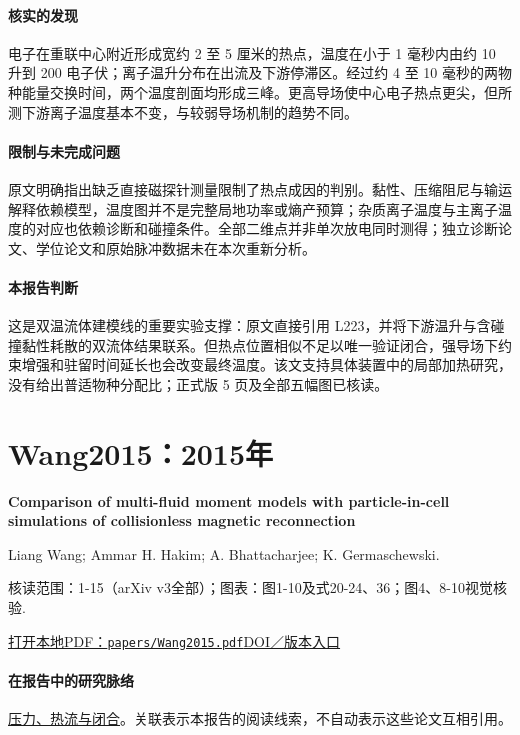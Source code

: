 \paragraph{核实的发现}电子在重联中心附近形成宽约 2 至 5 厘米的热点，温度在小于 1 毫秒内由约 10 升到 200 电子伏；离子温升分布在出流及下游停滞区。经过约 4 至 10 毫秒的两物种能量交换时间，两个温度剖面均形成三峰。更高导场使中心电子热点更尖，但所测下游离子温度基本不变，与较弱导场机制的趋势不同。

\paragraph{限制与未完成问题}原文明确指出缺乏直接磁探针测量限制了热点成因的判别。黏性、压缩阻尼与输运解释依赖模型，温度图并不是完整局地功率或熵产预算；杂质离子温度与主离子温度的对应也依赖诊断和碰撞条件。全部二维点并非单次放电同时测得；独立诊断论文、学位论文和原始脉冲数据未在本次重新分析。

\paragraph{本报告判断}这是双温流体建模线的重要实验支撑：原文直接引用 L223，并将下游温升与含碰撞黏性耗散的双流体结果联系。但热点位置相似不足以唯一验证闭合，强导场下约束增强和驻留时间延长也会改变最终温度。该文支持具体装置中的局部加热研究，没有给出普适物种分配比；正式版 5 页及全部五幅图已核读。

\section{Wang2015：2015年}\label{paper:Wang2015}

\textbf{Comparison of multi-fluid moment models with particle-in-cell simulations of collisionless magnetic reconnection}\citep{Wang2015}\

Liang Wang;  Ammar H. Hakim;  A. Bhattacharjee;  K. Germaschewski.

\textsf{核读范围：}1-15（arXiv v3全部）；\textsf{图表：}图1-10及式20-24、36；图4、8-10视觉核验.

\href{run:papers/Wang2015.pdf}{打开本地PDF：\texttt{papers/Wang2015.pdf}}\quad\href{https://doi.org/10.1063/1.4906063}{DOI／版本入口}

\paragraph{在报告中的研究脉络}\hyperref[story:closure]{压力、热流与闭合}。关联表示本报告的阅读线索，不自动表示这些论文互相引用。

